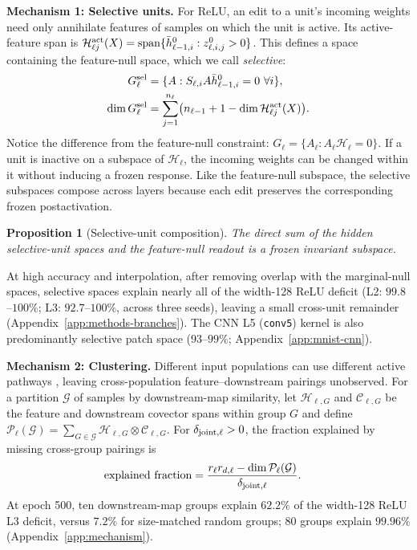 \documentclass[twoside]{article}
\newtheorem{proposition}[theorem]{Proposition}
\theoremstyle{remark}
\DeclareMathOperator{\spanop}{span}
\newcommand{\cH}{\mathcal H}
\theoremstyle{highlightdefinition}
\theoremstyle{remark}
\newcommand{\spn}{\spanop}
\begin{document}
\textbf{Mechanism 1: Selective units.}
For ReLU, an edit to a unit's incoming weights need only annihilate features of samples on which the unit is active. Its active-feature span is $\cH_{\ell j}^{\rm act}(X)=\spn\{\bar h_{\ell-1,i}^0:z_{\ell,i,j}^0>0\}$. This defines a space containing the feature-null space, which we call \emph{selective}:
\begin{align*}
 G_\ell^{\rm sel}&=\{A:S_{\ell,i}A\bar h_{\ell-1,i}^0=0\ \forall i\},\\
 \dim G_\ell^{\rm sel}
 &=\sum_{j=1}^{n_\ell}\bigl(n_{\ell-1}+1-\dim\cH_{\ell j}^{\rm act}(X)\bigr).
\end{align*}
Notice the difference from the feature-null constraint: $G_\ell = \{A_\ell:A_\ell\cH_\ell=0\}$. If a unit is inactive on a subspace of $\cH_\ell$, the incoming weights can be changed within it without inducing a frozen response.   Like the feature-null subspace, the selective subspaces compose across layers because each edit preserves the corresponding frozen postactivation.
\begin{proposition}[Selective-unit composition]\label{prop:selective-composition}
The direct sum of the hidden selective-unit spaces and the feature-null readout is a frozen invariant subspace. 
\end{proposition}
At high accuracy and interpolation, after removing overlap with the marginal-null spaces, selective spaces explain nearly all of the width-128 ReLU deficit (L2: $99.8$--$100\%$; L3: $92.7$--$100\%$, across three seeds), leaving a small cross-unit remainder (Appendix~\ref{app:methods-branches}). 
The CNN L5 (\texttt{conv5}) kernel is also predominantly selective patch space ($93$--$99\%$; Appendix~\ref{app:mnist-cnn}).


\textbf{Mechanism 2: Clustering.} Different input populations can use different active pathways \citep{lakshminarayanan2020paths}, leaving cross-population feature--downstream pairings unobserved. For a partition $\mathcal G$ of samples by downstream-map similarity, let $\mathcal H_{\ell,G}$ and $\mathcal C_{\ell,G}$ be the feature and downstream covector spans within group $G$ and define $\mathcal P_\ell(\mathcal G)=\sum_{G\in\mathcal G}\mathcal H_{\ell,G}\otimes\mathcal C_{\ell,G}$. For $\delta_{\rm joint,\ell}>0$, the fraction explained by missing cross-group pairings is
\begin{align*}
 \text{explained fraction}&=\frac{r_\ell r_{d,\ell}-\dim\mathcal P_\ell(\mathcal G)}{\delta_{\rm joint,\ell}}.
\end{align*}
At epoch 500, ten downstream-map groups explain $62.2\%$ of the width-128 ReLU L3 deficit, versus $7.2\%$ for size-matched random groups; 80 groups explain $99.96\%$ (Appendix~\ref{app:mechanism}).
\end{document}
